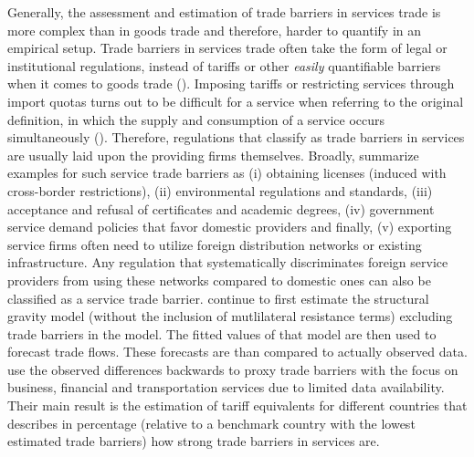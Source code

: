 Generally, the assessment and estimation of trade barriers in services trade is more complex than in goods trade and therefore, harder to quantify in an empirical setup. Trade barriers in services trade often take the form of legal or institutional regulations, instead of tariffs or other \textit{easily} quantifiable barriers when it comes to goods trade (\cite{Trade_Barriers_Korea}). Imposing tariffs or restricting services through import quotas turns out to be difficult for a service when referring to the original definition, in which the supply and consumption of a service occurs simultaneously (\cite{Trade_Barriers_Korea}). Therefore, regulations that classify as trade barriers in services are usually laid upon the providing firms themselves. Broadly, \textcite{Trade_Barriers_Korea} summarize examples for such service trade barriers as (i) obtaining licenses (induced with cross-border restrictions), (ii) environmental regulations and standards, (iii) acceptance and refusal of certificates and academic degrees, (iv) government service demand policies that favor domestic providers and finally, (v) exporting service firms often need to utilize foreign distribution networks or existing infrastructure. Any regulation that systematically discriminates foreign service providers from using these networks compared to domestic ones can also be classified as a service trade barrier. \textcite{Trade_Barriers_Korea} continue to first estimate the structural gravity model (without the inclusion of mutlilateral resistance terms) excluding trade barriers in the model. The fitted values of that model are then used to forecast trade flows. These forecasts are than compared to actually observed data. \textcite{Trade_Barriers_Korea} use the observed differences backwards to proxy trade barriers with the focus on business, financial and transportation services due to limited data availability. Their main result is the estimation of tariff equivalents for different countries that describes in percentage (relative to a benchmark country with the lowest estimated trade barriers) how strong trade barriers in services are. 







